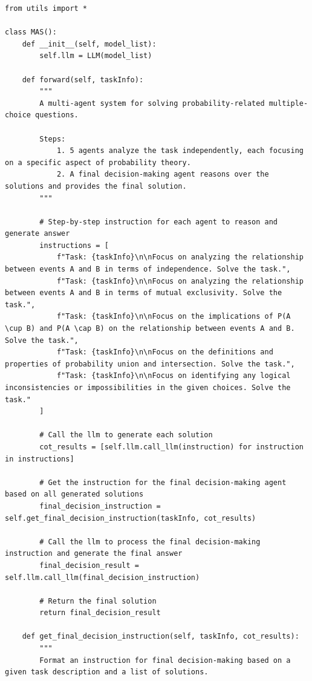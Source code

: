 \documentclass{article}
\theoremstyle{plain}
\theoremstyle{definition}
\theoremstyle{remark}
\begin{document}
\begin{lstlisting}[caption={Case 1: Multi-agent system generated by MAS-GPT. MAS-GPT can generate query-specific MAS. MAS-GPT designs five independent responding agents, each responsible for different aspects of the task.}, label={case1_mas}]
from utils import *

class MAS():
    def __init__(self, model_list):
        self.llm = LLM(model_list)

    def forward(self, taskInfo):
        """
        A multi-agent system for solving probability-related multiple-choice questions.

        Steps:
            1. 5 agents analyze the task independently, each focusing on a specific aspect of probability theory.
            2. A final decision-making agent reasons over the solutions and provides the final solution.
        """

        # Step-by-step instruction for each agent to reason and generate answer
        instructions = [
            f"Task: {taskInfo}\n\nFocus on analyzing the relationship between events A and B in terms of independence. Solve the task.",    
            f"Task: {taskInfo}\n\nFocus on analyzing the relationship between events A and B in terms of mutual exclusivity. Solve the task.",
            f"Task: {taskInfo}\n\nFocus on the implications of P(A \cup B) and P(A \cap B) on the relationship between events A and B. Solve the task.",
            f"Task: {taskInfo}\n\nFocus on the definitions and properties of probability union and intersection. Solve the task.",
            f"Task: {taskInfo}\n\nFocus on identifying any logical inconsistencies or impossibilities in the given choices. Solve the task."
        ]

        # Call the llm to generate each solution
        cot_results = [self.llm.call_llm(instruction) for instruction in instructions]

        # Get the instruction for the final decision-making agent based on all generated solutions
        final_decision_instruction = self.get_final_decision_instruction(taskInfo, cot_results)

        # Call the llm to process the final decision-making instruction and generate the final answer
        final_decision_result = self.llm.call_llm(final_decision_instruction)

        # Return the final solution
        return final_decision_result

    def get_final_decision_instruction(self, taskInfo, cot_results):
        """
        Format an instruction for final decision-making based on a given task description and a list of solutions.


\end{lstlisting}
\end{document}
